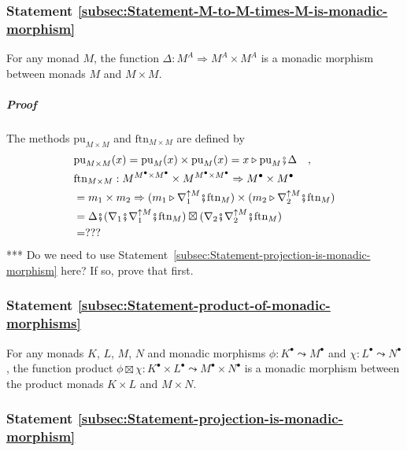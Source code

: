 \subsubsection{Statement \label{subsec:Statement-M-to-M-times-M-is-monadic-morphism}\ref{subsec:Statement-M-to-M-times-M-is-monadic-morphism}}

For any monad $M$, the function $\Delta:M^{A}\Rightarrow M^{A}\times M^{A}$
is a monadic morphism between monads $M$ and $M\times M$.

\subparagraph{Proof}

The methods $\text{pu}_{M\times M}$ and $\text{ftn}_{M\times M}$
are defined by
\begin{align*}
 & \text{pu}_{M\times M}(x)=\text{pu}_{M}(x)\times\text{pu}_{M}(x)=x\triangleright\text{pu}_{M}\bef\Delta\quad,\\
 & \text{ftn}_{M\times M}:M^{M^{\bullet}\times M^{\bullet}}\times M^{M^{\bullet}\times M^{\bullet}}\Rightarrow M^{\bullet}\times M^{\bullet}\\
 & =m_{1}\times m_{2}\Rightarrow(m_{1}\triangleright\nabla_{1}^{\uparrow M}\bef\text{ftn}_{M})\times(m_{2}\triangleright\nabla_{2}^{\uparrow M}\bef\text{ftn}_{M})\\
 & =\Delta\bef(\nabla_{1}\bef\nabla_{1}^{\uparrow M}\bef\text{ftn}_{M})\boxtimes(\nabla_{2}\bef\nabla_{2}^{\uparrow M}\bef\text{ftn}_{M})\\
 & =???
\end{align*}
{*}{*}{*} Do we need to use Statement~\ref{subsec:Statement-projection-is-monadic-morphism}
here? If so, prove that first.

\subsubsection{Statement \label{subsec:Statement-product-of-monadic-morphisms}\ref{subsec:Statement-product-of-monadic-morphisms}}

For any monads $K$, $L$, $M$, $N$ and monadic morphisms $\phi:K^{\bullet}\leadsto M^{\bullet}$
and $\chi:L^{\bullet}\leadsto N^{\bullet}$, the function product
$\phi\boxtimes\chi:K^{\bullet}\times L^{\bullet}\leadsto M^{\bullet}\times N^{\bullet}$
is a monadic morphism between the product monads $K\times L$ and
$M\times N$.

\subsubsection{Statement \label{subsec:Statement-projection-is-monadic-morphism}\ref{subsec:Statement-projection-is-monadic-morphism}}

